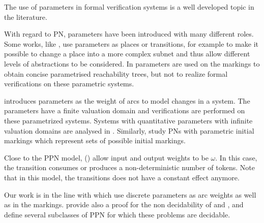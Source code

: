 The use of parameters in formal verification systems is a well developed topic in the literature.

With regard to \ac{PN}, parameters have been introduced with many different roles.
Some works, like \cite{Christensen97}, use parameters as places or transitions, for example to make it possible to change a place into a more complex subnet and thus allow different levels of abstractions to be considered.
In \cite{Lindqvist91} parameters are used on the markings to obtain concise parametrised reachability trees, but not to realize formal verifications on these parametric systems.

\cite{Badouel99} introduces parameters as the weight of arcs to model changes in a system.
The parameters have a finite valuation domain and verifications are performed on these parametrized systems.
Systems with quantitative parameters with infinite valuation domains are analysed in \cite{Abdulla13}.
Similarly, \cite{Marsan94} study \acp{PN} with parametric initial markings which represent sets of possible initial markings.

Close to the \ac{PPN} model, \opns (\cite{Geeraerts15}) allow input and output weights to be $\omega$. In this case, the transition consumes or produces a non-deterministic number of tokens. Note that in this model, the transitions does not have a constant effect anymore.

Our work is in the line with \cite{David17} which use discrete parameters as arc weights as well as in the markings.
\cite{David17} provide also a proof for the non decidability of \Ucov and \Ecov, and define several subclasses of \ac{PPN} for which these problems are decidable.

